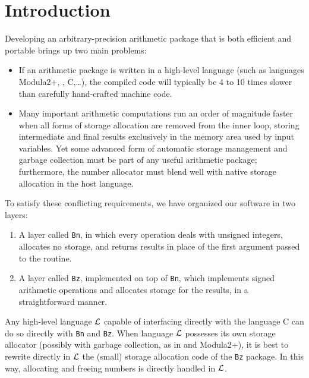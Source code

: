 
\section{Introduction}
Developing an arbitrary-precision arithmetic package that is
both efficient and portable brings up two main problems:
\begin{itemize}
  \item
If an arithmetic package is written in a  high-level language
(such as languages Modula2+, \lelisp, C,\ldots), the compiled code
will typically be 4 to 10  
times slower than carefully hand-crafted machine code.
  \item Many important arithmetic computations run an order of magnitude
faster when all forms of storage allocation are removed
from the inner loop,
storing intermediate and final results exclusively in the memory area
used by input variables. Yet some advanced form of automatic
storage management and garbage collection must be part of any useful
arithmetic package; furthermore, the number allocator must blend well with
native storage allocation in the host language.
\end{itemize}
To satisfy these conflicting requirements, we have organized our
software in two layers:
\begin{enumerate}
  \item A layer called \verb+Bn+, in which every operation deals with unsigned
integers,  allocates no storage,
and returns results in place of the first
argument passed to the routine. 
  \item A layer called \verb+Bz+, implemented on top of \verb+Bn+,
which implements signed arithmetic operations and allocates
storage for the results, in a straightforward manner.
\end{enumerate}
 
Any high-level language ${\cal L}$
capable of interfacing directly with the
language C can do so directly with \verb+Bn+ and  \verb+Bz+. When language
${\cal L}$ possesses its own storage allocator (possibly
with garbage collection, as 
in \lelisp  and Modula2+), it is best to rewrite directly 
in ${\cal L}$ the (small)
storage allocation code of the \verb+Bz+ package. In this way, 
allocating and freeing numbers is directly handled in ${\cal L}$. 
 
